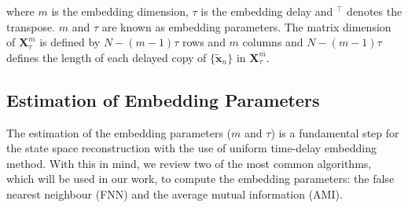\documentclass[fleqn,10pt]{wlscirep}
\begin{document}
where $m$ is the embedding dimension, $\tau$ is the embedding delay and $ ^\intercal$ denotes the transpose.
$m$ and $\tau$ are known as embedding parameters.
The matrix dimension of $ \boldsymbol{X}_{\tau}^{m} $ is defined by $N-(m-1)\tau$ rows and $m$ columns and $N-(m-1)\tau$ defines the length of each delayed copy of $\{ \boldsymbol{ \tilde{x} }_n \}$ in $\boldsymbol{X}^{m}_{\tau}$.

\subsection*{Estimation of Embedding Parameters}
The estimation of the embedding parameters ($m$ and $\tau$) is a fundamental step for the state space reconstruction with the use of uniform time-delay embedding method.
With this in mind, we review two of the most common algorithms, which will be used in our work, to compute the embedding parameters: the false nearest neighbour (FNN) and the average mutual information (AMI).

\end{document}
